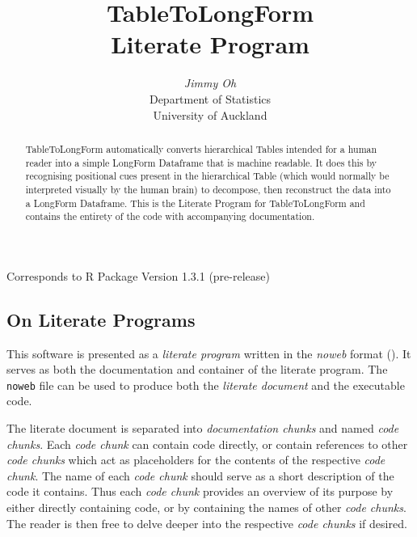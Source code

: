 \documentclass[a4paper]{article}
\begin{document}
\renewcommand\abstractname{\large Abstract}
\title{\textbf{TableToLongForm}\\
  Literate Program}
\author{\textit{Jimmy Oh}\\
  [12pt] Department of Statistics\\
  University of Auckland}
\date{}
\maketitle
\codemargin=24pt
\begin{center}
Corresponds to R Package Version 1.3.1 (pre-release)
\end{center}
\begin{abstract}\normalsize
  TableToLongForm automatically converts hierarchical Tables intended
  for a human reader into a simple LongForm Dataframe that is machine
  readable. It does this by recognising positional cues present in the
  hierarchical Table (which would normally be interpreted visually by
  the human brain) to decompose, then reconstruct the data into a
  LongForm Dataframe. This is the Literate Program for TableToLongForm
  and contains the entirety of the code with accompanying
  documentation.
\end{abstract}
\tableofcontents

\subsection*{On Literate Programs}
\label{sec:literate.program}
This software is presented as a \emph{literate program} written in the
\emph{noweb} format (\citealt{noweb}). It serves as both the
documentation and container of the literate program. The \verb|noweb|
file can be used to produce both the \emph{literate document} and the
executable code.

The literate document is separated into \emph{documentation chunks}
and named \emph{code chunks}. Each \emph{code chunk} can contain code
directly, or contain references to other \emph{code chunks} which act
as placeholders for the contents of the respective \emph{code
  chunk}. The name of each \emph{code chunk} should serve as a short
description of the code it contains. Thus each \emph{code chunk}
provides an overview of its purpose by either directly containing
code, or by containing the names of other \emph{code chunks}. The
reader is then free to delve deeper into the respective \emph{code
  chunks} if desired.
\end{document}
